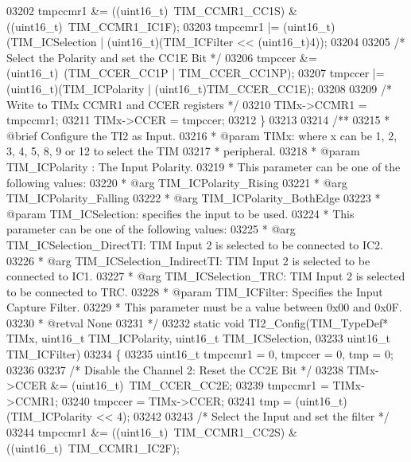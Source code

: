 \begin{DoxyCode}
03202   tmpccmr1 &= ((uint16\_t)~TIM_CCMR1_CC1S) & ((uint16\_t)~TIM_CCMR1_IC1F);
03203   tmpccmr1 |= (uint16\_t)(TIM\_ICSelection | (uint16\_t)(TIM\_ICFilter << (uint16\_t)4));
03204 
03205   \textcolor{comment}{/* Select the Polarity and set the CC1E Bit */}
03206   tmpccer &= (uint16\_t)~(TIM_CCER_CC1P | TIM_CCER_CC1NP);
03207   tmpccer |= (uint16\_t)(TIM\_ICPolarity | (uint16\_t)TIM_CCER_CC1E);
03208 
03209   \textcolor{comment}{/* Write to TIMx CCMR1 and CCER registers */}
03210   TIMx->CCMR1 = tmpccmr1;
03211   TIMx->CCER = tmpccer;
03212 \}
03213 
03214 \textcolor{comment}{/**}
03215 \textcolor{comment}{  * @brief  Configure the TI2 as Input.}
03216 \textcolor{comment}{  * @param  TIMx: where x can be 1, 2, 3, 4, 5, 8, 9 or 12 to select the TIM }
03217 \textcolor{comment}{  *         peripheral.}
03218 \textcolor{comment}{  * @param  TIM\_ICPolarity : The Input Polarity.}
03219 \textcolor{comment}{  *          This parameter can be one of the following values:}
03220 \textcolor{comment}{  *            @arg TIM\_ICPolarity\_Rising}
03221 \textcolor{comment}{  *            @arg TIM\_ICPolarity\_Falling}
03222 \textcolor{comment}{  *            @arg TIM\_ICPolarity\_BothEdge   }
03223 \textcolor{comment}{  * @param  TIM\_ICSelection: specifies the input to be used.}
03224 \textcolor{comment}{  *          This parameter can be one of the following values:}
03225 \textcolor{comment}{  *            @arg TIM\_ICSelection\_DirectTI: TIM Input 2 is selected to be connected to IC2.}
03226 \textcolor{comment}{  *            @arg TIM\_ICSelection\_IndirectTI: TIM Input 2 is selected to be connected to IC1.}
03227 \textcolor{comment}{  *            @arg TIM\_ICSelection\_TRC: TIM Input 2 is selected to be connected to TRC.}
03228 \textcolor{comment}{  * @param  TIM\_ICFilter: Specifies the Input Capture Filter.}
03229 \textcolor{comment}{  *          This parameter must be a value between 0x00 and 0x0F.}
03230 \textcolor{comment}{  * @retval None}
03231 \textcolor{comment}{  */}
03232 \textcolor{keyword}{static} \textcolor{keywordtype}{void} TI2_Config(TIM\_TypeDef* TIMx, uint16\_t TIM\_ICPolarity, uint16\_t TIM\_ICSelection,
03233                        uint16\_t TIM\_ICFilter)
03234 \{
03235   uint16\_t tmpccmr1 = 0, tmpccer = 0, tmp = 0;
03236 
03237   \textcolor{comment}{/* Disable the Channel 2: Reset the CC2E Bit */}
03238   TIMx->CCER &= (uint16\_t)~TIM_CCER_CC2E;
03239   tmpccmr1 = TIMx->CCMR1;
03240   tmpccer = TIMx->CCER;
03241   tmp = (uint16\_t)(TIM\_ICPolarity << 4);
03242 
03243   \textcolor{comment}{/* Select the Input and set the filter */}
03244   tmpccmr1 &= ((uint16\_t)~TIM_CCMR1_CC2S) & ((uint16\_t)~TIM_CCMR1_IC2F);

\end{DoxyCode}
